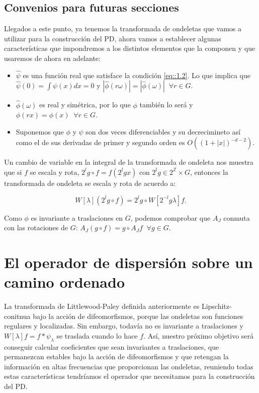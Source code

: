 \medskip


\subsection{Convenios para futuras secciones}

\noindent Llegados a este punto, ya tenemos la transformada de ondeletas que vamos a utilizar para la construcción del PD, ahora vamos a establecer algunas características que impondremos a los distintos elementos que la componen y que usaremos de ahora en adelante: 

\begin{itemize}
    \item $\widehat{\psi}$ es una función real que satisface la condición \eqref{eq::1.2}. Lo que implica que $\widehat{\psi}(0)=\int \psi(x)dx=0$ y $|\widehat{\phi}(r\omega)|=|\widehat{\phi}(\omega)| \;\; \forall r\in G$.
    \item $\widehat{\phi}(\omega)$ es real y simétrica, por lo que $\phi$ también lo será y $\phi(rx)=\phi(x) \;\; \forall r \in G$. 
    \item Suponemos que $\phi$ y $\psi$ son dos veces diferenciables y su decrecimineto así como el de sus derivadas de primer y segundo orden es $O((1+|x|)^{-d-2})$.
\end{itemize}

\medskip

\noindent Un cambio de variable en la integral de la transformada de ondeleta nos muestra que si $f$ se escala y rota, $2^lg \circ f=f(2^lgx)$ con $2^lg \in 2^{\mathbb{Z}} \times G$, entonces la transformada de ondeleta se escala y rota de acuerdo a: 

\begin{equation}
  W[\lambda](2^lg\circ f)=2^lg \circ W[2^{-l}g\lambda]f.
\end{equation}

\medskip

\noindent Como $\phi$ es invariante a traslaciones en $G$, podemos comprobar que $A_J$ conmuta con las rotaciones de $G$: $A_J(g\circ f)=g\circ A_J f \;\; \forall g \in G$. 

\section{El operador de dispersión sobre un camino ordenado}

\noindent La transformada de Littlewood-Paley definida anteriormente es Lipschitz-conitnua bajo la acción de difeomorfismos, porque las ondeletas son funciones regulares y localizadas. Sin embargo, todavía no es invariante a traslaciones y $W[\lambda]f=f\ast\psi_\lambda$ se traslada cuando lo hace $f$. Así, nuestro próximo objetivo será conseguir calcular coeficientes que sean invariantes a traslaciones, que permanezcan estables bajo la acción de difeomorfismos y que retengan la información en altas frecuencias que proporcionan las ondeletas, reuniendo todas estas características tendríamos el operador que necesitamos para la construcción del PD. 

